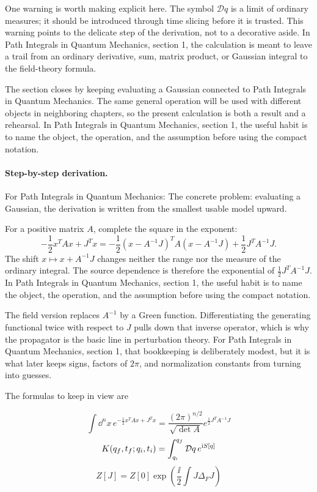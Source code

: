 One warning is worth making explicit here.  The symbol \(\mathcal D q\) is a limit of ordinary measures; it should be introduced through time slicing before it is trusted.  This warning points to the delicate step of the derivation, not to a decorative aside.  In Path Integrals in Quantum Mechanics, section 1, the calculation is meant to leave a trail from an ordinary derivative, sum, matrix product, or Gaussian integral to the field-theory formula.

The section closes by keeping evaluating a Gaussian connected to Path Integrals in Quantum Mechanics.  The same general operation will be used with different objects in neighboring chapters, so the present calculation is both a result and a rehearsal.  In Path Integrals in Quantum Mechanics, section 1, the useful habit is to name the object, the operation, and the assumption before using the compact notation.



\paragraph{Step-by-step derivation.}

For Path Integrals in Quantum Mechanics: The concrete problem: evaluating a Gaussian, the derivation is written from the smallest usable model upward.

For a positive matrix \(A\), complete the square in the exponent:
\[
  -\frac12x^TAx+J^Tx
  =
  -\frac12(x-A^{-1}J)^TA(x-A^{-1}J)
  +\frac12J^TA^{-1}J.
\]
The shift \(x\mapsto x+A^{-1}J\) changes neither the range nor the measure of the ordinary integral.  The source dependence is therefore the exponential of \(\frac12J^TA^{-1}J\).  In Path Integrals in Quantum Mechanics, section 1, the useful habit is to name the object, the operation, and the assumption before using the compact notation.

The field version replaces \(A^{-1}\) by a Green function.  Differentiating the generating functional twice with respect to \(J\) pulls down that inverse operator, which is why the propagator is the basic line in perturbation theory.  For Path Integrals in Quantum Mechanics, section 1, that bookkeeping is deliberately modest, but it is what later keeps signs, factors of \(2\pi\), and normalization constants from turning into guesses.

The formulas to keep in view are

\[
  \int\dd^n x\,e^{-\frac12x^TAx+J^Tx}=\frac{(2\pi)^{n/2}}{\sqrt{\det A}}e^{\frac12J^TA^{-1}J}
\]
\[
  K(q_f,t_f;q_i,t_i)=\int_{q_i}^{q_f}\mathcal D q\,e^{\mathrm i S[q]}
\]
\[
  Z[J]=Z[0]\exp\left(\frac{\ii}{2}\int J\Delta_FJ\right)
\]

